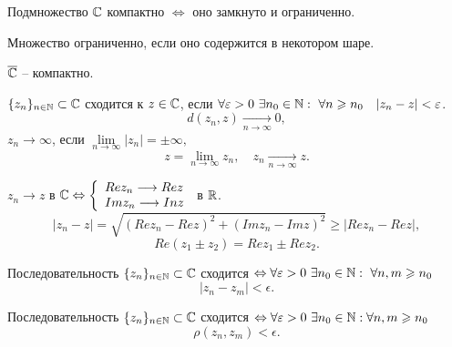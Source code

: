 \begin{theorem}
    Подмножество $ \mathbb{C} $ компактно $ \iff $ оно замкнуто и ограниченно.
\end{theorem}

\begin{note}
    Множество ограниченно, если оно содержится в некотором шаре.
\end{note}

\begin{remark}
    $ \overline{\mathbb{C}} $ -- компактно.
\end{remark}

\begin{definition}
    $ \{z_n\}_{n\in\mathbb{N}} \subset \mathbb{C} $ сходится к $ z \in \mathbb{C} $, если $ \forall \epsilon > 0 \ \exists n_0 \in \N: \ \forall n \geqslant n_0 \quad | z_n - z | < \epsilon $.
    \[
        d(z_n,z) \xrightarrow[n \rightarrow \infty]{} 0,
    \]
    $ z_n \longrightarrow \infty $, если $ \underset{n \rightarrow \infty}{\lim}| z_n | =\pm\infty, $
    \[
        z = \underset{n \rightarrow\infty}{\lim}z_n, \quad  z_n \xrightarrow[n \rightarrow \infty]{} z.
    \]
\end{definition}

\begin{remark}
    $ z_n \longrightarrow z $ в $ \mathbb{C} \Leftrightarrow \left\{\begin{array}{l}
            Rez_n \longrightarrow Rez \\
            Imz_n \longrightarrow Inz
        \end{array}\right. $ в $ \mathbb{R} $.
    \[
        | z_n - z | = \sqrt{(Re z_n - Re z)^2 + (Im z_n - Im z)^2} \geqslant | Re z_n - Re z |,
    \]
    \[
        Re(z_1 \pm z_2) = Rez_1 \pm Re z_2.
    \]
\end{remark}

\begin{theorem}
    Последовательность $ \{z_n\}_{n\in\mathbb{N}} \subset \mathbb{C} $ сходится $ \Leftrightarrow \forall \varepsilon > 0 \ \exists n_0 \in \mathbb{N} : \ \forall n,m \geqslant n_0 $
    \[
        | z_n - z_m | < \epsilon.
    \]
\end{theorem}

\begin{theorem}
    Последовательность $ \{z_n\}_{n\in\mathbb{N}}\subset \mathbb{C} $ сходится $ \Leftrightarrow \forall \varepsilon > 0 \ \exists n_0 \in \mathbb{N} : \forall n,m \geqslant n_0 $
    \[
        \rho(z_n,z_m) < \epsilon.
    \]
\end{theorem}

